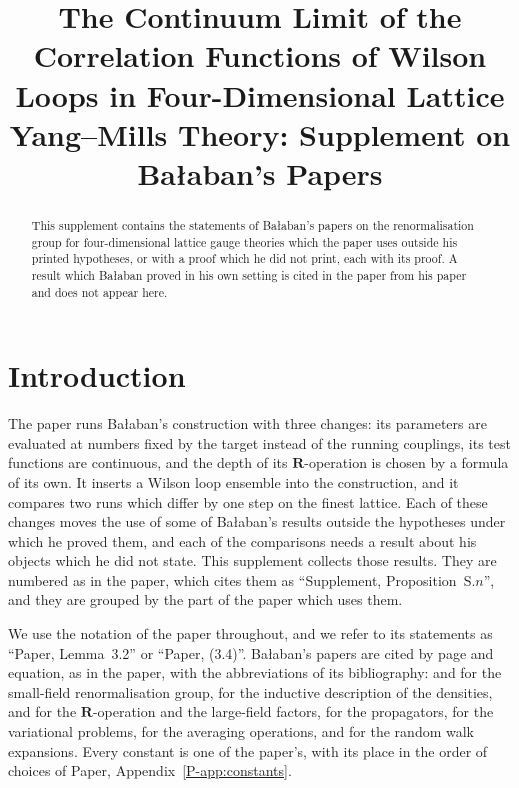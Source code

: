 \documentclass[11pt]{preprint}
\title{The Continuum Limit of the Correlation Functions of Wilson Loops in Four-Dimensional Lattice Yang--Mills Theory: Supplement on Ba{\l}aban's Papers}
\author{}
\date{}
\numberwithin{equation}{section}
\theoremstyle{definition}
\theoremstyle{remark}
\theoremstyle{plain}
\begin{document}
\maketitle

\begin{abstract}
This supplement contains the statements of Ba{\l}aban's papers on the renormalisation group for four-dimensional lattice gauge theories which the paper uses outside his printed hypotheses, or with a proof which he did not print, each with its proof. A result which Ba{\l}aban proved in his own setting is cited in the paper from his paper and does not appear here.
\end{abstract}

\setcounter{tocdepth}{1}
{\setlength{\parskip}{0pt}\tableofcontents}

\section{Introduction}\label{sec:introduction}

The paper runs Ba{\l}aban's construction with three changes: its parameters are evaluated at numbers fixed by the target instead of the running couplings, its test functions are continuous, and the depth of its $\mathbf R$-operation is chosen by a formula of its own. It inserts a Wilson loop ensemble into the construction, and it compares two runs which differ by one step on the finest lattice. Each of these changes moves the use of some of Ba{\l}aban's results outside the hypotheses under which he proved them, and each of the comparisons needs a result about his objects which he did not state. This supplement collects those results. They are numbered as in the paper, which cites them as ``Supplement, Proposition~S.$n$'', and they are grouped by the part of the paper which uses them.

We use the notation of the paper throughout, and we refer to its statements as ``Paper, Lemma~3.2'' or ``Paper, (3.4)''. Ba{\l}aban's papers are cited by page and equation, as in the paper, with the abbreviations of its bibliography: \cite{BalabanRG1} and \cite{BalabanRG2} for the small-field renormalisation group, \cite{BalabanCRE} for the inductive description of the densities, \cite{BalabanLFR1} and \cite{BalabanLFR2} for the $\mathbf R$-operation and the large-field factors, \cite{BalabanPBG} for the propagators, \cite{BalabanVAR} for the variational problems, \cite{BalabanAVG} for the averaging operations, and \cite{BalabanPRT1,BalabanPRT2} for the random walk expansions. Every constant is one of the paper's, with its place in the order of choices of Paper, Appendix~\ref{P-app:constants}.
\end{document}
